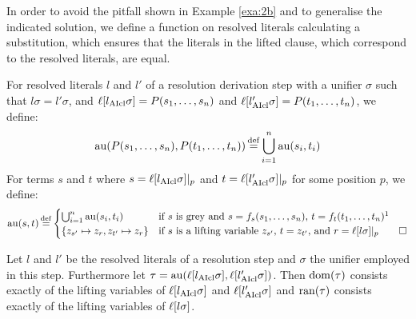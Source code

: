 \documentclass[,%
	draft=false,%
	numbers=noendperiod
	oneside,openany
	a4paper,
	11pt,
]{memoir}
\begin{document}
In order to avoid the pitfall shown in Example \ref{exa:2b} and to generalise the indicated solution,
we define a function on resolved literals calculating a substitution, which ensures that the literals in the lifted clause, which correspond to the resolved literals, are equal.

\begin{defi}[$\aiu$] 
	For resolved literals $l $ and $l'$ of a resolution derivation step with a unifier $\sigma$ such that $l\sigma = l'\sigma$,
	and $\ell[l_{\operatorname{AIcl}}\sigma] = P(s_1, \dots, s_n)$ and $\ell[l'_{\operatorname{AIcl}}\sigma] = P(t_1, \dots, t_n)$, we define:
	\[
		\operatorname{au} (P(s_1, \dots, s_n), P(t_1, \dots, t_n)) \operatorname{\stackrel{\mathrm{def}}{=}} \bigcup_{i=1}^n \operatorname{au}(s_i, t_i)
	\]
	For terms $s$ and $t$ where
	$s = \ell[l_{\operatorname{AIcl}}\sigma]|_{p}$
	and 
	$t = \ell[l'_{\operatorname{AIcl}}\sigma]|_{p}$
	for some position $p$, we define:
	\[
		\aiu (s, t) \defeq
		\begin{cases}
			\bigcup_{i=1}^n \aiu(s_i, t_i) & \text{if $s$ is grey and $s=f_s(s_1, \dots, s_n)$, $t = f_{t}(t_1,\dots, t_n)$\footnotemark} \\
			\{z_{s'} \mapsto z_r, z_{t'} \mapsto z_r\} &
			\text{if $s$ is a lifting variable $z_{s'}$, $t = z_{t'}$,
			and $r = \lifboth{l\sigma}\at{p}$} 
			\qedhere
		\end{cases}
	\]
\end{defi}

\begin{prop}
	\label{prop:tau_dom_ran}
	Let $l$ and $l'$ be the resolved literals of a resolution step and $\sigma$ the unifier employed in this step.
	Furthermore let $\tau = \operatorname{au}(\ell[l_{\operatorname{AIcl}}\sigma], \ell[l'_{\operatorname{AIcl}}\sigma])$.
	Then $\operatorname{dom}(\tau)$ consists exactly of the lifting variables of $\ell[l_{\operatorname{AIcl}}\sigma]$ and $\ell[l'_{\operatorname{AIcl}}\sigma]$ and $\operatorname{ran}(\tau)$ consists exactly of the lifting variables of $\ell[l\sigma]$.
\end{prop}

\end{document}
